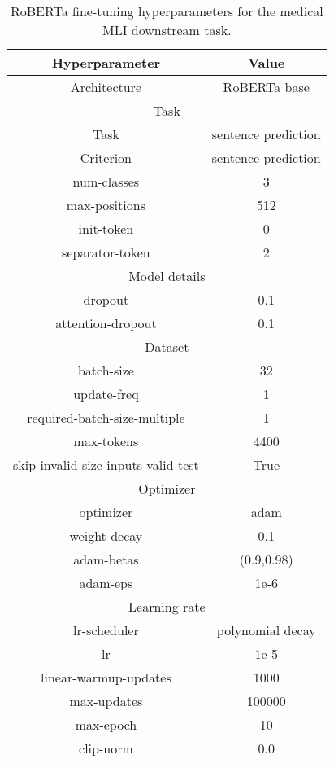 \begin{table}[!h]
	\caption{RoBERTa fine-tuning hyperparameters for the medical MLI downstream task.}
	\label{tab:roberta_finetune_medical}
	\begin{center}
		\begin{tabular}{|c|c|}
			\hline
			Hyperparameter\cellcolor[gray]{0.6} & Value \cellcolor[gray]{0.6} \\ \hline
Architecture & RoBERTa base \\ \hline 
\multicolumn{2}{|c|}{\cellcolor[gray]{0.9} Task}\\ \hline 
Task& sentence prediction \\ \hline 
Criterion & sentence prediction \\ \hline 
num-classes & 3 \\ \hline 
max-positions & 512 \\ \hline
init-token & 0  \\ \hline 
separator-token & 2  \\ \hline 
\multicolumn{2}{|c|}{\cellcolor[gray]{0.9} Model details}\\ \hline 
dropout & 0.1 \\ \hline 
attention-dropout & 0.1 \\ \hline 
\multicolumn{2}{|c|}{\cellcolor[gray]{0.9} Dataset}\\ \hline 
batch-size & 32 \\ \hline 
update-freq & 1 \\ \hline 
required-batch-size-multiple & 1 \\ \hline
max-tokens & 4400 \\ \hline
skip-invalid-size-inputs-valid-test & True \\ \hline
\multicolumn{2}{|c|}{\cellcolor[gray]{0.9} Optimizer } \\ \hline 
optimizer &adam \\ \hline 
weight-decay & 0.1 \\ \hline 
adam-betas & (0.9,0.98) \\ \hline 
adam-eps & 1e-6 \\ \hline 
\multicolumn{2}{|c|}{\cellcolor[gray]{0.9} Learning rate} \\ \hline 
lr-scheduler & polynomial decay \\ \hline 
lr & 1e-5 \\ \hline 
linear-warmup-updates & 1000 \\ \hline 
max-updates & 100000 \\ \hline 
max-epoch & 10 \\ \hline
clip-norm & 0.0 \\ \hline 
		\end{tabular}
	\end{center}
\end{table}